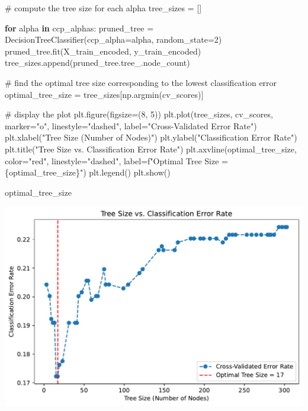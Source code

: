 \documentclass[
  letterpaper,
  DIV=11,
  numbers=noendperiod]{scrartcl}
\newenvironment{Shaded}{\begin{snugshade}}{\end{snugshade}}
\newcommand{\CommentTok}[1]{\textcolor[rgb]{0.37,0.37,0.37}{#1}}
\newcommand{\ControlFlowTok}[1]{\textcolor[rgb]{0.00,0.23,0.31}{\textbf{#1}}}
\newcommand{\DecValTok}[1]{\textcolor[rgb]{0.68,0.00,0.00}{#1}}
\newcommand{\KeywordTok}[1]{\textcolor[rgb]{0.00,0.23,0.31}{\textbf{#1}}}
\newcommand{\NormalTok}[1]{\textcolor[rgb]{0.00,0.23,0.31}{#1}}
\newcommand{\OperatorTok}[1]{\textcolor[rgb]{0.37,0.37,0.37}{#1}}
\newcommand{\SpecialCharTok}[1]{\textcolor[rgb]{0.37,0.37,0.37}{#1}}
\newcommand{\SpecialStringTok}[1]{\textcolor[rgb]{0.13,0.47,0.30}{#1}}
\newcommand{\StringTok}[1]{\textcolor[rgb]{0.13,0.47,0.30}{#1}}
\begin{document}
\begin{Shaded}
\begin{Highlighting}[]
\CommentTok{\# compute the tree size for each alpha}
\NormalTok{tree\_sizes }\OperatorTok{=}\NormalTok{ []}

\ControlFlowTok{for}\NormalTok{ alpha }\KeywordTok{in}\NormalTok{ ccp\_alphas:}
\NormalTok{    pruned\_tree }\OperatorTok{=}\NormalTok{ DecisionTreeClassifier(ccp\_alpha}\OperatorTok{=}\NormalTok{alpha, random\_state}\OperatorTok{=}\DecValTok{2}\NormalTok{)}
\NormalTok{    pruned\_tree.fit(X\_train\_encoded, y\_train\_encoded)}
\NormalTok{    tree\_sizes.append(pruned\_tree.tree\_.node\_count)}

\CommentTok{\# find the optimal tree size corresponding to the lowest classification error}
\NormalTok{optimal\_tree\_size }\OperatorTok{=}\NormalTok{ tree\_sizes[np.argmin(cv\_scores)]}

\CommentTok{\# display the plot}
\NormalTok{plt.figure(figsize}\OperatorTok{=}\NormalTok{(}\DecValTok{8}\NormalTok{, }\DecValTok{5}\NormalTok{))}
\NormalTok{plt.plot(tree\_sizes, cv\_scores, marker}\OperatorTok{=}\StringTok{"o"}\NormalTok{, linestyle}\OperatorTok{=}\StringTok{"dashed"}\NormalTok{,}
\NormalTok{         label}\OperatorTok{=}\StringTok{"Cross{-}Validated Error Rate"}\NormalTok{)}
\NormalTok{plt.xlabel(}\StringTok{"Tree Size (Number of Nodes)"}\NormalTok{)}
\NormalTok{plt.ylabel(}\StringTok{"Classification Error Rate"}\NormalTok{)}
\NormalTok{plt.title(}\StringTok{"Tree Size vs. Classification Error Rate"}\NormalTok{)}
\NormalTok{plt.axvline(optimal\_tree\_size, color}\OperatorTok{=}\StringTok{"red"}\NormalTok{, linestyle}\OperatorTok{=}\StringTok{"dashed"}\NormalTok{,}
\NormalTok{            label}\OperatorTok{=}\SpecialStringTok{f"Optimal Tree Size = }\SpecialCharTok{\{}\NormalTok{optimal\_tree\_size}\SpecialCharTok{\}}\SpecialStringTok{"}\NormalTok{)}
\NormalTok{plt.legend()}
\NormalTok{plt.show()}

\NormalTok{optimal\_tree\_size}
\end{Highlighting}
\end{Shaded}

\includegraphics{PS4_files/figure-pdf/cell-16-output-1.pdf}
\end{document}
